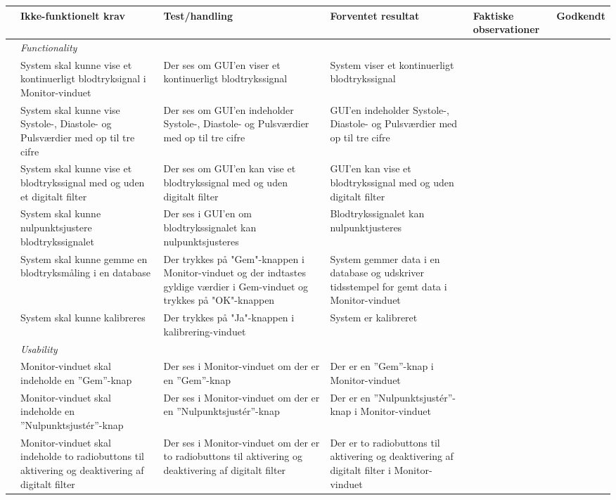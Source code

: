 \begin{longtabu} to 
	& Ikke-funktionelt krav & Test/handling & Forventet resultat & Faktiske observationer & Godkendt
	\\[-1ex] \midrule
	&  \textit{Functionality} &  &  & & \\ \midrule
	& System skal kunne vise et kontinuerligt blodtryksignal i Monitor-vinduet & Der ses om GUI'en viser et kontinuerligt blodtrykssignal & System viser et kontinuerligt blodtrykssignal &  & %
	\\ \midrule
	& System skal kunne vise Systole-, Diastole- og Pulsværdier med op til tre cifre & Der ses om GUI'en indeholder Systole-, Diastole- og Pulsværdier med op til tre cifre & GUI'en indeholder Systole-, Diastole- og Pulsværdier med op til tre cifre &  & %
	\\ \midrule
	& System skal kunne vise et blodtrykssignal med og uden et digitalt filter & Der ses om GUI'en kan vise et blodtrykssignal med og uden digitalt filter & GUI'en kan vise et blodtrykssignal med og uden digitalt filter &  & %
	\\ \midrule
	& System skal kunne nulpunktsjustere blodtrykssignalet & Der ses i GUI'en om blodtrykssignalet kan nulpunktsjusteres & Blodtrykssignalet kan nulpunktjusteres &  & %
	\\ \midrule
	& System skal kunne gemme en blodtryksmåling i en database & Der trykkes på "Gem"\--knappen i Monitor-vinduet og der indtastes gyldige værdier i Gem-vinduet og trykkes på "OK"\--knappen & System gemmer data i en database og udskriver tidsstempel for gemt data i Monitor-vinduet &  & %
	\\ \midrule
	& System skal kunne kalibreres & Der trykkes på "Ja"\--knappen i kalibrering-vinduet & System er kalibreret &  & %
	\\ \midrule
	& \textit{Usability} &  &  & & \\ \midrule
	& Monitor-vinduet skal indeholde en ”Gem”\--knap & Der ses i Monitor-vinduet om der er en ”Gem”\--knap & Der er en ”Gem”\--knap i Monitor-vinduet &  & %
	\\ \midrule
	& Monitor-vinduet skal indeholde en ”Nulpunktsjustér”\--knap & Der ses i Monitor-vinduet om der er en ”Nulpunktsjustér”\--knap & Der er en ”Nulpunktsjustér”\--knap i Monitor-vinduet &  & %
	\\ \midrule 
	& Monitor-vinduet skal indeholde to radiobuttons til aktivering og deaktivering af digitalt filter & Der ses i Monitor-vinduet om der er to radiobuttons til aktivering og deaktivering af digitalt filter & Der er to radiobuttons til aktivering og deaktivering af digitalt filter i Monitor-vinduet &  & %

\end{longtabu}
